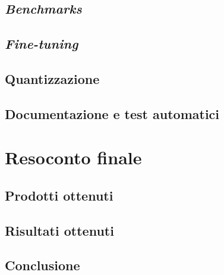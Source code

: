     \subsection{\textit{Benchmarks}}
    \subsection{\textit{Fine-tuning}}
    \subsection{Quantizzazione}
    \subsection{Documentazione e test automatici}

\section{Resoconto finale}
    \subsection{Prodotti ottenuti}
    \subsection{Risultati ottenuti}
    \subsection{Conclusione}

\newpage